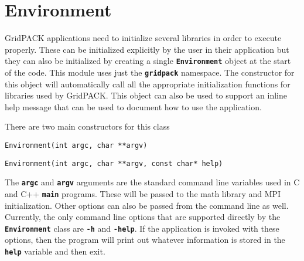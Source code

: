 \section{Environment}\label{environment}

GridPACK applications need to initialize several libraries in order to execute
properly. These can be initialized explicitly by the user in their
application but they can also be initialized by creating a single
\texttt{\textbf{Environment}} object at the start of the code. This module uses
just the \texttt{\textbf{gridpack}} namespace. The constructor
for this object will automatically call all the appropriate initialization
functions for libraries used by GridPACK. This object can also be used to
support an inline help message that can be used to document how to use the
application.

There are two main constructors for this class

{
\color{red}
\begin{Verbatim}[fontseries=b]
Environment(int argc, char **argv)
\end{Verbatim}
}

{
\color{red}
\begin{Verbatim}[fontseries=b]
Environment(int argc, char **argv, const char* help)
\end{Verbatim}
}

The \texttt{\textbf{argc}} and \texttt{\textbf{argv}} arguments are the standard
command line variables used in C and C++ \texttt{\textbf{main}} programs. These
will be passed to the math library and MPI initialization. Other options can also be
passed from the command line as well. Currently, the only command line
options that are supported directly by the \texttt{\textbf{Environment}} class
are \texttt{\textbf{-h}} and \texttt{\textbf{-help}}. If the application is invoked
with these options, then the program will print out whatever information is stored
in the \texttt{\textbf{help}} variable and then exit.
